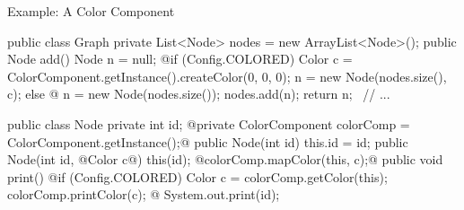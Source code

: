 \begin{frame}[fragile]{Example: A Color Component}
	\begin{mycolumns}[columns=2,widths={60,40}]
{\small
\begin{codetight}{}
public class Graph {
	private List<Node> nodes = new ArrayList<Node>();
	public Node add() {
		Node n = null;
		@if (Config.COLORED) {
			Color c = ColorComponent.getInstance().createColor(0, 0, 0);
			n = new Node(nodes.size(), c);
		} else @ {
			n = new Node(nodes.size());
		}
		nodes.add(n);
		return n;
	}
	~// ...~
}
\end{codetight}
}
		\mynextcolumn
\vspace{-0.5cm}
{\small
\begin{codetight}{}
public class Node {
	private int id;
	@private ColorComponent colorComp =
		ColorComponent.getInstance();@
	public Node(int id) { this.id = id; }
	public Node(int id, @Color c@) {
		this(id);
		@colorComp.mapColor(this, c);@
	}
	public void print() {
		@if (Config.COLORED) {
			Color c = colorComp.getColor(this);
			colorComp.printColor(c);
		}@
		System.out.print(id);
	}
}
\end{codetight}
}			
	\end{mycolumns}
\end{frame}

